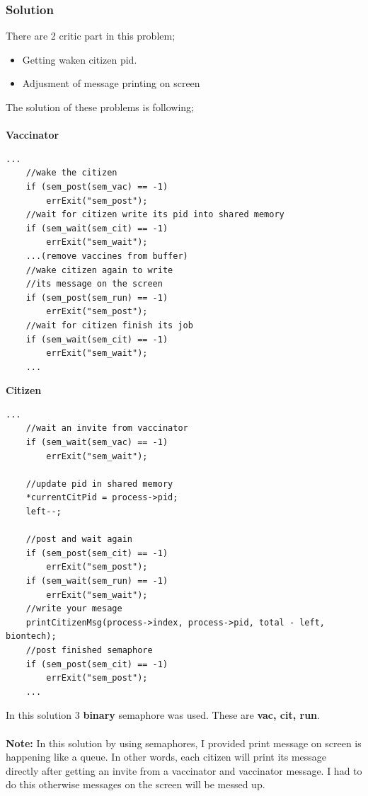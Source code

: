 \documentclass{article}
\begin{document}
\subsubsection{Solution}
There are 2 critic part in this problem;
\begin{itemize}
	\item Getting waken citizen pid.
	\item Adjusment of message printing on screen
\end{itemize}
The solution of these problems is following;\\ \\
\textbf{Vaccinator}
\begin{lstlisting}[style=CStyle]
    ...
    //wake the citizen
    if (sem_post(sem_vac) == -1)
        errExit("sem_post");
    //wait for citizen write its pid into shared memory
    if (sem_wait(sem_cit) == -1) 
        errExit("sem_wait");
    ...(remove vaccines from buffer)
    //wake citizen again to write
    //its message on the screen
    if (sem_post(sem_run) == -1)
        errExit("sem_post");
    //wait for citizen finish its job
    if (sem_wait(sem_cit) == -1) 
        errExit("sem_wait");
    ...
\end{lstlisting}
\cleardoublepage
\textbf{Citizen}
\begin{lstlisting}[style=CStyle]
    ...
    //wait an invite from vaccinator
    if (sem_wait(sem_vac) == -1)
        errExit("sem_wait");

    //update pid in shared memory    
    *currentCitPid = process->pid;
    left--;

    //post and wait again
    if (sem_post(sem_cit) == -1)
        errExit("sem_post");
    if (sem_wait(sem_run) == -1)
        errExit("sem_wait");
    //write your mesage
    printCitizenMsg(process->index, process->pid, total - left, biontech);
    //post finished semaphore
    if (sem_post(sem_cit) == -1)
        errExit("sem_post");
    ...
\end{lstlisting}

In this solution 3 \textbf{binary} semaphore was used. These are \textbf{vac, cit, run}. \\ \\
\textbf{Note:} In this solution by using semaphores, I provided print message on screen
is happening like a queue. In other words, each citizen will print its message directly after getting an invite
from a vaccinator and vaccinator message. I had to do this otherwise messages on the screen will be messed up.
\end{document}
